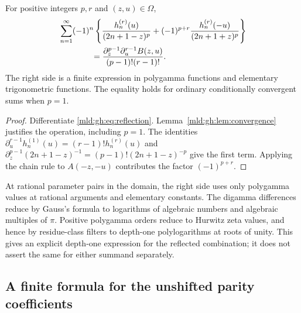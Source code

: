 \begin{corollary}
\label{mld:gh:cor:derivatives}
For positive integers $p,r$ and $(z,u)\in\Omega$,
\begin{align}
 &\sum_{n=1}^{\infty}(-1)^n
   \left\{\frac{h_n^{(r)}(u)}{(2n+1-z)^p}
       +(-1)^{p+r}\frac{h_n^{(r)}(-u)}{(2n+1+z)^p}\right\}
       \notag\\
 &\hspace{14mm}=
 \frac{\partial_z^{p-1}\partial_u^{r-1}B(z,u)}
      {(p-1)!(r-1)!}.\label{mld:gh:eq:allmixed}
\end{align}
The right side is a finite expression in polygamma functions and
elementary trigonometric functions. The equality holds for ordinary
conditionally convergent sums when $p=1$.
\end{corollary}
\begin{proof}
Differentiate \eqref{mld:gh:eq:reflection}. Lemma~\ref{mld:gh:lem:convergence}
justifies the operation, including $p=1$. The identities
$\partial_u^{r-1}h_n^{(1)}(u)=(r-1)!h_n^{(r)}(u)$ and
$\partial_z^{p-1}(2n+1-z)^{-1}=(p-1)!(2n+1-z)^{-p}$
give the first term. Applying the chain rule to $A(-z,-u)$ contributes
the factor $(-1)^{p+r}$.
\end{proof}

At rational parameter pairs in the domain, the right side uses only
polygamma values at rational arguments and elementary constants. The
digamma differences reduce by Gauss's formula to logarithms of algebraic
numbers and algebraic multiples of $\pi$. Positive polygamma orders
reduce to Hurwitz zeta values, and hence by residue-class filters to
depth-one polylogarithms at roots of unity. This gives an explicit
depth-one expression for the reflected combination; it does not assert
the same for either summand separately.

\subsection{A finite formula for the unshifted parity coefficients}

